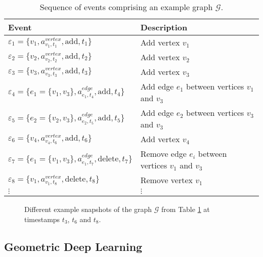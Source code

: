 \begin{table}[ht]
    \centering
    \begin{tabular}{|l|l|}
        \hline
        Event & Description \\
        \hline
        $\varepsilon_{1} = \{v_1, a^{vertex}_{v_1, t_1}, \mathrm{add}, t_1\}$ & Add vertex $v_1$\\
        $\varepsilon_{2} = \{v_2, a^{vertex}_{v_2, t_2}, \mathrm{add}, t_2\}$ & Add vertex $v_2$\\
        $\varepsilon_{3} = \{v_3, a^{vertex}_{v_3, t_3}, \mathrm{add}, t_3\}$ & Add vertex $v_3$\\
        $\varepsilon_{4} = \{e_1 = \{v_1, v_3\}, a^{edge}_{e_1, t_4}, \mathrm{add}, t_4\}$ & Add edge $e_1$ between vertices $v_1$ and $v_3$\\
        $\varepsilon_{5} = \{e_2 = \{v_2, v_3\}, a^{edge}_{e_2, t_5}, \mathrm{add}, t_5\}$ & Add edge $e_2$ between vertices $v_3$ and $v_3$\\
        $\varepsilon_{6} = \{v_4, a^{vertex}_{v_4, t_6}, \mathrm{add}, t_6\}$ & Add vertex $v_4$\\
        $\varepsilon_{7} = \{e_1 = \{v_1, v_3\}, a^{edge}_{e_1, t_7}, \mathrm{delete}, t_7\}$ & Remove edge $e_i$ between vertices $v_1$ and $v_3$\\
        $\varepsilon_{8} = \{v_1, a^{vertex}_{v_1, t_8}, \mathrm{delete}, t_8\}$ & Remove vertex $v_1$\\
        $\vdots$ & $\vdots$ \\
    \end{tabular}
    \caption{Sequence of events comprising an example graph $\mathcal{G}.$}
    \label{t_ctdg_events}
\end{table}

\begin{figure}[ht]
    
    \caption{Different example snapshots of the graph $\mathcal{G}$ from Table \ref{t_ctdg_events} at timestamps $t_3$, $t_6$ and $t_8$.}
    \label{f_ctdg}
\end{figure}


\subsection{Geometric Deep Learning}
\label{s_Background_GeometricDeepLearning}


